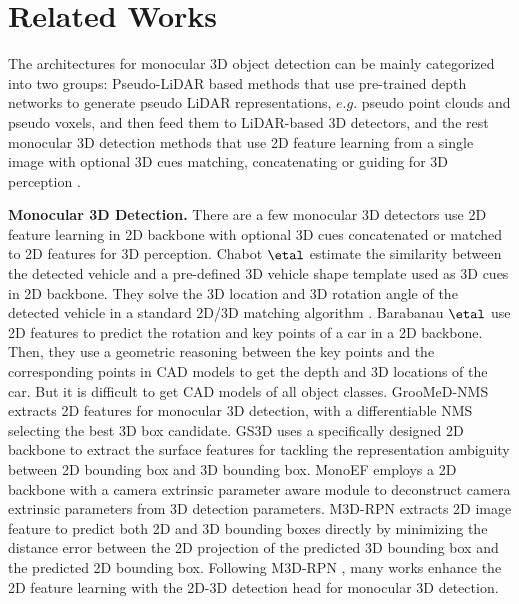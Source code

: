 \documentclass[10pt,twocolumn,letterpaper]{article}
\begin{document}
\section{Related Works}
The architectures for monocular 3D object detection can be mainly categorized into two groups:
Pseudo-LiDAR based methods \cite{Liang_corr,simonelli2021we,chu2021neighbor} that use pre-trained depth networks to
generate pseudo LiDAR representations, $e.g.$ pseudo point clouds and pseudo voxels, and then feed them to LiDAR-based 3D detectors, and the rest monocular 3D detection methods that use 2D feature learning from a single image with optional 3D cues matching, concatenating or guiding for 3D perception \cite{Lu_2021_ICCV,liu2021autoshape,MonoFlex,Zou_2021_ICCV,reading2021categorical,rukhovich2021imvoxelnet,murez2020atlas}. 


\textbf{Monocular 3D Detection.} There are a few monocular 3D detectors use 2D feature learning in 2D backbone with optional 3D cues concatenated or matched to 2D features for 3D perception.
Chabot $\etal$ \cite{chabot2017deep} estimate the similarity between the detected vehicle and a pre-defined 3D vehicle shape template used as 3D cues in 2D backbone. They solve the 3D location and 3D rotation angle of the detected vehicle in a standard 2D/3D matching algorithm \cite{lepetit2009epnp}. Barabanau $\etal$ \cite{barabanau2019monocular} use 2D features to predict the rotation and key points of a car in a 2D backbone. Then, they use a geometric reasoning between the key points and the corresponding points in CAD models to get the depth and 3D locations of the car. But it is difficult to get CAD models of all object classes.
GrooMeD-NMS \cite{kumar2021groomed} extracts 2D features for monocular 3D detection, with a differentiable NMS selecting the best 3D box candidate. GS3D \cite{li2019gs3d} uses a specifically designed 2D backbone to extract the surface features for tackling the representation ambiguity between 2D bounding box and 3D bounding box. MonoEF \cite{zhou2021monocular} employs a 2D backbone with a camera extrinsic parameter aware module to deconstruct camera extrinsic parameters from 3D detection parameters. M3D-RPN \cite{brazil2019m3d} extracts 2D image feature to predict both 2D and 3D bounding boxes directly by minimizing the distance error between the 2D projection of the predicted 3D bounding box and the predicted 2D bounding box. Following M3D-RPN \cite{brazil2019m3d}, many works \cite{luo2021m3dssd,park2021pseudo,peng2021lidar} enhance the 2D feature learning with the 2D-3D detection head for monocular 3D detection. 
\end{document}
